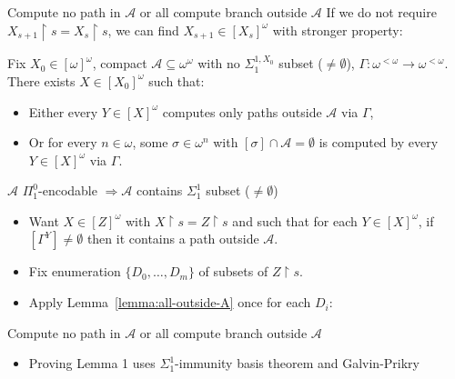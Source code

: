 \begin{frame}{Compute no path in $\mathcal{A}$ or all compute branch
outside $\mathcal{A}$}
  If we do not require $X_{s+1}\restriction s=X_s\restriction s$, we can
  find $X_{s+1}\in[X_s]^\omega$ with stronger property:

  \begin{lemma}
  \label{lemma:all-outside-A}
    Fix $X_0\in[\omega]^\omega$, compact
    $\mathcal{A}\subseteq\omega^\omega$ with no $\Sigma_1^{1,X_0}$ subset
    ($\neq\emptyset$), $\Gamma:\omega^{<\omega} \rightarrow
    \omega^{<\omega}$. There exists $X\in[X_0]^\omega$ such that:

    \begin{itemize}
      \item Either every $Y\in[X]^\omega$ computes only paths outside
        $\mathcal{A}$ via $\Gamma$,
      \item Or for every $n\in\omega$, some $\sigma\in\omega^n$ with
        $[\sigma]\cap\mathcal{A}=\emptyset$ is computed by every
        $Y\in[X]^\omega$ via $\Gamma$.
    \end{itemize}
  \end{lemma}
\end{frame}

\begin{frame}{$\mathcal{A}$ $\Pi_1^0$-encodable $\Rightarrow \mathcal{A}$
contains $\Sigma_1^1$ subset ($\neq\emptyset$)}
  \begin{itemize}
    \item Want $X\in[Z]^\omega$ with $X\restriction s=Z\restriction s$
      and such that for each $Y\in[X]^\omega$, if $[\Gamma^Y]\neq\emptyset$
      then it contains a path outside $\mathcal{A}$.
    \item Fix enumeration $\{D_0,\ldots,D_m\}$ of subsets of $Z\restriction
      s$.
    \item Apply Lemma~\ref{lemma:all-outside-A} once for each $D_i$:
  \end{itemize}
\end{frame}

\begin{frame}{Compute no path in $\mathcal{A}$ or all compute branch
  outside $\mathcal{A}$}
  \begin{itemize}
    \item Proving Lemma 1 uses $\Sigma_1^1$-immunity basis theorem and
      Galvin-Prikry
  \end{itemize}
\end{frame}

